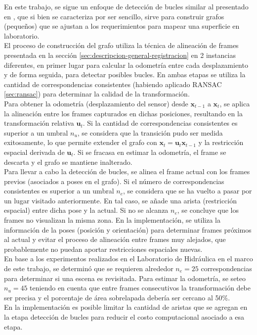 En este trabajo, se sigue un enfoque de detección de bucles similar al presentado en \cite{henry2010rgb}, que si bien se caracteriza por ser sencillo, sirve para construir grafos (pequeños) que se ajustan a los requerimientos para mapear una superficie en laboratorio. \\
El proceso de construcción del grafo utiliza la técnica de alineación de frames presentada en la sección \ref{sec:descripcion-general-registracion} en 2 instancias diferentes, en primer lugar para calcular la odometría entre cada desplazamiento y de forma seguida, para detectar posibles bucles. En ambas etapas se utiliza la cantidad de correspondencias consistentes (habiendo aplicado RANSAC \ref{sec:ransac}) para determinar la calidad de la transformación. \\
Para obtener la odometría (desplazamiento del sensor) desde $\textbf{x}_{t-1}$ a $\textbf{x}_{t}$, se aplica la alineación entre los frames capturados en dichas posiciones, resultando en la transformación relativa $\textbf{u}_{t}$. Si la cantidad de correspondencias consistentes es superior a un umbral $n_{u}$, se considera que la transición pudo ser medida exitosamente, lo que permite extender el grafo con $\textbf{x}_{t} = \textbf{u}_{t} \textbf{x}_{t-1}$ y la restricción espacial derivada de $\textbf{u}_{t}$. Si se fracasa en estimar la odometría, el frame se descarta y el grafo se mantiene inalterado. \\
Para llevar a cabo la detección de bucles, se alinea el frame actual con los frames previos (asociados a poses en el grafo). Si el número de correspondencias consistentes es superior a un umbral $n_{e}$, se considera que se ha vuelto a pasar por un lugar visitado anteriormente. En tal caso, se añade una arista (restricción espacial) entre dicha pose y la actual. Si no se alcanza $n_{e}$, se concluye que los frames no visualizan la misma zona. En la implementación, se utiliza la información de la poses (posición y orientación) para determinar frames próximos al actual y evitar el proceso de alineación entre frames muy alejados, que probablemente no puedan aportar restricciones espaciales nuevas. \\
En base a los experimentos realizados en el Laboratorio de Hidráulica en el marco de este trabajo, se determinó que se requieren alrededor $n_{e} = 25$ correspondencias para determinar si una escena es revisitada. Para estimar la odometría, se seteo $n_{u} = 45$ teniendo en cuenta que entre frames consecutivos la transformación debe ser precisa y el porcentaje de área sobrelapada debería ser cercano al 50\%. \\
En la implementación es posible limitar la cantidad de aristas que se agregan en la etapa detección de bucles para reducir el costo computacional asociado a esa etapa.

